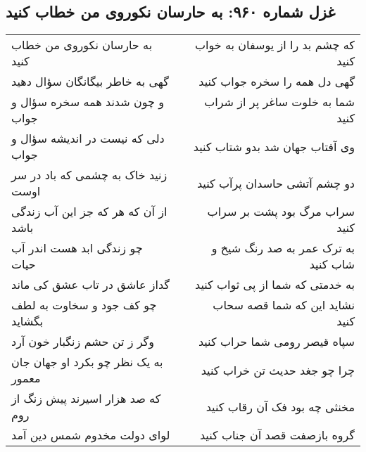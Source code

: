 \begin{center}
\section*{غزل شماره ۹۶۰: به حارسان نکوروی من خطاب کنید}
\label{sec:0960}
\begin{longtable}{l p{0.5cm} r}
به حارسان نکوروی من خطاب کنید
&&
که چشم بد را از یوسفان به خواب کنید
\\
گهی به خاطر بیگانگان سؤال دهید
&&
گهی دل همه را سخره جواب کنید
\\
و چون شدند همه سخره سؤال و جواب
&&
شما به خلوت ساغر پر از شراب کنید
\\
دلی که نیست در اندیشه سؤال و جواب
&&
وی آفتاب جهان شد بدو شتاب کنید
\\
زنید خاک به چشمی که باد در سر اوست
&&
دو چشم آتشی حاسدان پرآب کنید
\\
از آن که هر که جز این آب زندگی باشد
&&
سراب مرگ بود پشت بر سراب کنید
\\
چو زندگی ابد هست اندر آب حیات
&&
به ترک عمر به صد رنگ شیخ و شاب کنید
\\
گداز عاشق در تاب عشق کی ماند
&&
به خدمتی که شما از پی ثواب کنید
\\
چو کف جود و سخاوت به لطف بگشاید
&&
نشاید این که شما قصه سحاب کنید
\\
وگر ز تن حشم زنگبار خون آرد
&&
سپاه قیصر رومی شما حراب کنید
\\
به یک نظر چو بکرد او جهان جان معمور
&&
چرا چو جغد حدیث تن خراب کنید
\\
که صد هزار اسیرند پیش زنگ از روم
&&
مخنثی چه بود فک آن رقاب کنید
\\
لوای دولت مخدوم شمس دین آمد
&&
گروه بازصفت قصد آن جناب کنید
\\
\end{longtable}
\end{center}

